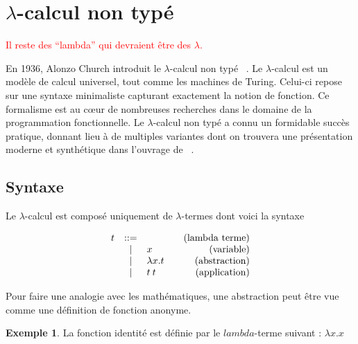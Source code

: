 \documentclass {article}
\makeatletter
\theoremstyle{definition}
\newtheorem{example}{Exemple}
\theoremstyle{remark}
\newcommand{\todo}[1]{\textcolor{red}{#1}}
\newenvironment{bnf}
               {\[\begin{array}{lcl@{\qquad}r}}
               {\end{array}\]}
\makeatother
\begin{document}
\section{$\lambda$-calcul non typé}
\label{sec:untyped}

\todo{Il reste des ``lambda'' qui devraient être des $\lambda$.}

En 1936, Alonzo Church introduit le $\lambda$-calcul non typé
~\citep{church:lambda-calcul}. Le $\lambda$-calcul est
un modèle de calcul universel, tout comme les machines de Turing. Celui-ci repose
sur une syntaxe minimaliste capturant exactement la notion de fonction. Ce formalisme est au c\oe{}ur de nombreuses recherches dans le domaine de la 
programmation fonctionnelle. Le $\lambda$-calcul non typé a connu un formidable 
succès pratique, donnant lieu à de multiples variantes dont on trouvera une présentation
 moderne et synthétique dans l'ouvrage de ~\citet{pierce:tapl}.

\subsection{Syntaxe}
Le $\lambda$-calcul est composé uniquement de \(\lambda\)-termes dont voici la syntaxe

\newcommand{\Lam}[2]{\ensuremath{\lambda #1. #2}}
\newcommand{\App}[2]{\ensuremath{#1\:#2}}
\newcommand{\Var}[1]{\ensuremath{#1}}
\newcommand{\Fst}[1]{\ensuremath{#1.\pi_0}}
\newcommand{\Snd}[1]{\ensuremath{#1.\pi_1}}
\newcommand{\Pair}[2]{\ensuremath{(#1, #2)}}
\newcommand{\ifte}[4][]{\ensuremath{\mathsf{if}_{#1}\: #2\: \mathsf{then}\: #3\: \mathsf{else}\: #4}}
\newcommand{\true}{\ensuremath{\mathsf{true}}}
\newcommand{\false}{\ensuremath{\mathsf{false}}}
\newcommand{\zero}{\ensuremath{\mathsf{zero}}} 
\newcommand{\succs}{\ensuremath{\mathsf{succ}}}
\newcommand{\iter}{\ensuremath{\mathsf{iter}}}


\begin{bnf}
  t &::= & &\mbox{(lambda terme)} \\
  &|& \Var{x} & \mbox{(variable)} \\
  &|& \Lam{x}{t} & \mbox{(abstraction)} \\
  &|& \App{t}{t}          & \mbox{(application)}
\end{bnf}

Pour faire une analogie avec les mathématiques, une abstraction peut
être vue comme une définition de fonction anonyme.
 
\begin{example}
 La fonction identité est définie par le $lambda$-terme suivant : $\Lam{x}{\Var{x}}$
\end{example}
\end{document}
